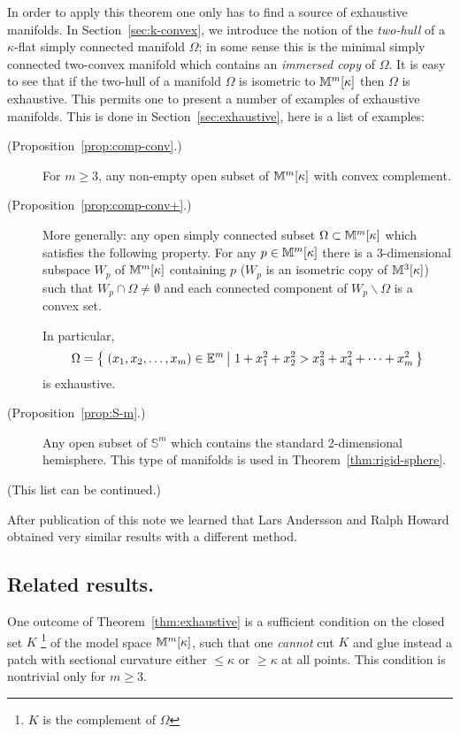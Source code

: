 \documentclass[oneside,a4paper]{article}
\begin{document}
In order to apply this theorem one only has to find a source of exhaustive manifolds.
In Section~\ref{sec:k-convex}, we introduce the notion of the {\it two-hull} of a $\kappa$-flat simply connected  manifold $\Omega$;
in some sense this is the minimal simply connected two-convex manifold which contains  an \emph{immersed copy} of $\Omega$.
It is easy to see that  if the two-hull of a manifold $\Omega$ is isometric to $\mathbb{M}^m[\kappa]$ then $\Omega$ is exhaustive.
This permits one to present a number of examples of exhaustive manifolds.
This is done in Section~\ref{sec:exhaustive},
here is a list of examples:

\medskip

\begin{description}
\item[(Proposition~\ref{prop:comp-conv}.)] For $m\ge 3$, any non-empty open subset of $\mathbb{M}^m[\kappa]$ with convex complement.
\medskip

\item[(Proposition~\ref{prop:comp-conv+}.)]
More generally:
any open simply connected subset $\Omega\z\subset\MM^m[\kappa]$ which satisfies the following property.
For any $p\in \mathbb{M}^m[\kappa]$
there is a 3-dimensional subspace $W_p$ of $\mathbb{M}^m[\kappa]$ containing $p$
($W_p$ is an isometric copy of $\mathbb{M}^3[\kappa]$)
such that $W_p\cap\Omega\not=\emptyset$
and each connected component of $W_p\backslash\Omega$ is a convex set.

In particular,
$$\Omega
=
\set{(x_1,x_2,\dots,x_m)\in \EE^m}{1+x_1^2+x_2^2>x_3^2+x_4^2+\dots+x_m^2}
$$
is exhaustive.

\medskip

\item[(Proposition~\ref{prop:S-m}.)] Any  open subset of $\mathbb S^m$ which
contains the standard 2-dimensional hemisphere.
This type of manifolds is used in Theorem~\ref{thm:rigid-sphere}.
\medskip
\end{description}
(This list can be continued.)


After publication of this note we learned that  Lars Andersson and Ralph Howard \cite{andersson-howard} obtained very similar results with a different method.

\subsection*{Related results.}

One outcome of Theorem~\ref{thm:exhaustive} is a sufficient condition on the closed set $K$%
\footnote{$K$ is the complement of $\Omega$} of the model space $\mathbb{M}^m[\kappa]$,
such that one \emph{cannot} cut $K$ and glue instead a patch with sectional curvature either $\le \kappa$ or $\ge \kappa$ at all points. 
This condition is nontrivial only for $m\ge 3$.
\end{document}
